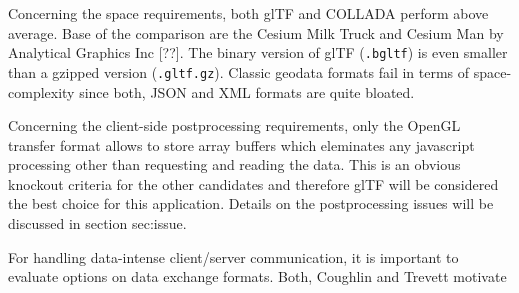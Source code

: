       Concerning the space requirements, both glTF and COLLADA perform above average. Base of the comparison are the Cesium Milk Truck and Cesium Man by Analytical Graphics Inc [??]. The binary version of glTF (\texttt{.bgltf}) is even smaller than a gzipped version (\texttt{.gltf.gz}). Classic geodata formats fail in terms of space-complexity since both, JSON and XML formats are quite bloated.\par
      Concerning the client-side postprocessing requirements, only the OpenGL transfer format allows to store array buffers which eleminates any javascript processing other than requesting and reading the data. This is an obvious knockout criteria for the other candidates and therefore glTF will be considered the best choice for this application. Details on the postprocessing issues will be discussed in section {sec:issue}.\par
      For handling data-intense client/server communication, it is important to
      evaluate options on data exchange formats. Both, Coughlin and Trevett motivate
